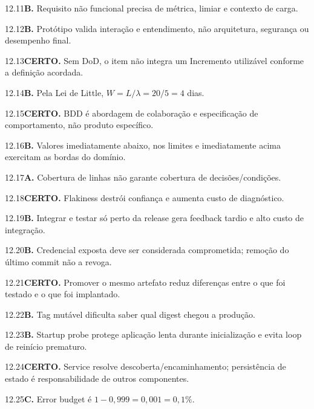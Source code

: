 \begin{solucao}{12.11}\textbf{B.} Requisito não funcional precisa de métrica, limiar e contexto de carga.\end{solucao}
\begin{solucao}{12.12}\textbf{B.} Protótipo valida interação e entendimento, não arquitetura, segurança ou desempenho final.\end{solucao}
\begin{solucao}{12.13}\textbf{CERTO.} Sem DoD, o item não integra um Incremento utilizável conforme a definição acordada.\end{solucao}
\begin{solucao}{12.14}\textbf{B.} Pela Lei de Little, $W=L/\lambda=20/5=4$ dias.\end{solucao}
\begin{solucao}{12.15}\textbf{CERTO.} BDD é abordagem de colaboração e especificação de comportamento, não produto específico.\end{solucao}
\begin{solucao}{12.16}\textbf{B.} Valores imediatamente abaixo, nos limites e imediatamente acima exercitam as bordas do domínio.\end{solucao}
\begin{solucao}{12.17}\textbf{A.} Cobertura de linhas não garante cobertura de decisões/condições.\end{solucao}
\begin{solucao}{12.18}\textbf{CERTO.} Flakiness destrói confiança e aumenta custo de diagnóstico.\end{solucao}
\begin{solucao}{12.19}\textbf{B.} Integrar e testar só perto da release gera feedback tardio e alto custo de integração.\end{solucao}
\begin{solucao}{12.20}\textbf{B.} Credencial exposta deve ser considerada comprometida; remoção do último commit não a revoga.\end{solucao}
\begin{solucao}{12.21}\textbf{CERTO.} Promover o mesmo artefato reduz diferenças entre o que foi testado e o que foi implantado.\end{solucao}
\begin{solucao}{12.22}\textbf{B.} Tag mutável dificulta saber qual digest chegou a produção.\end{solucao}
\begin{solucao}{12.23}\textbf{B.} Startup probe protege aplicação lenta durante inicialização e evita loop de reinício prematuro.\end{solucao}
\begin{solucao}{12.24}\textbf{CERTO.} Service resolve descoberta/encaminhamento; persistência de estado é responsabilidade de outros componentes.\end{solucao}
\begin{solucao}{12.25}\textbf{C.} Error budget é $1-0,999=0,001=0,1\%$.\end{solucao}

